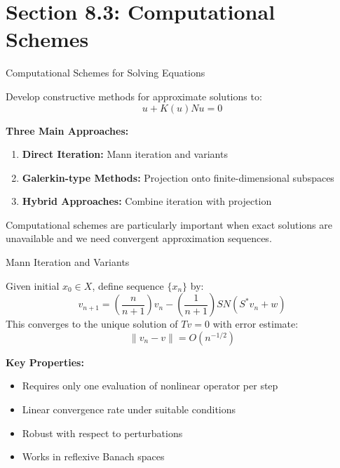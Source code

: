 \documentclass[aspectratio=169,10pt]{beamer}
\begin{document}
\section{Section 8.3: Computational Schemes}

\begin{frame}{Computational Schemes for Solving Equations}
    \begin{objective}
        Develop constructive methods for approximate solutions to:
        \[
            u + K(u)Nu = 0
        \]
    \end{objective}

    \vspace{0.3cm}
    \textbf{Three Main Approaches:}
    \begin{enumerate}
        \item \textbf{Direct Iteration:} Mann iteration and variants
        \item \textbf{Galerkin-type Methods:} Projection onto finite-dimensional subspaces
        \item \textbf{Hybrid Approaches:} Combine iteration with projection
    \end{enumerate}

    \vspace{0.3cm}
    \begin{remark}
        Computational schemes are particularly important when exact solutions are
        unavailable and we need convergent approximation sequences.
    \end{remark}
\end{frame}

\begin{frame}{Mann Iteration and Variants}
    \begin{algorithm}
        Given initial $x_0 \in X$, define sequence $\{x_n\}$ by:
        \[
            v_{n+1} = \left(\frac{n}{n+1}\right) v_n - \left(\frac{1}{n+1}\right) SN(S^* v_n + w)
        \]
        This converges to the unique solution of $Tv = 0$ with error estimate:
        \[
            \|v_n - v\| = O(n^{-1/2})
        \]
    \end{algorithm}

    \vspace{0.3cm}
    \textbf{Key Properties:}
    \begin{itemize}
        \item Requires only one evaluation of nonlinear operator per step
        \item Linear convergence rate under suitable conditions
        \item Robust with respect to perturbations
        \item Works in reflexive Banach spaces
    \end{itemize}
\end{frame}
\end{document}
